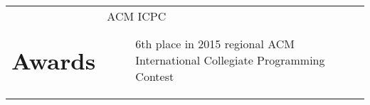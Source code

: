 \documentclass[10pt]{article} %
\begin{document}
\begin{tabularx}{\textwidth}{p{3cm} X}
\section*{Awards} &
\begin{description}
    \item[ACM ICPC] 6th place in 2015 regional ACM International Collegiate Programming Contest
\end{description}
\end{tabularx}
\end{document}
